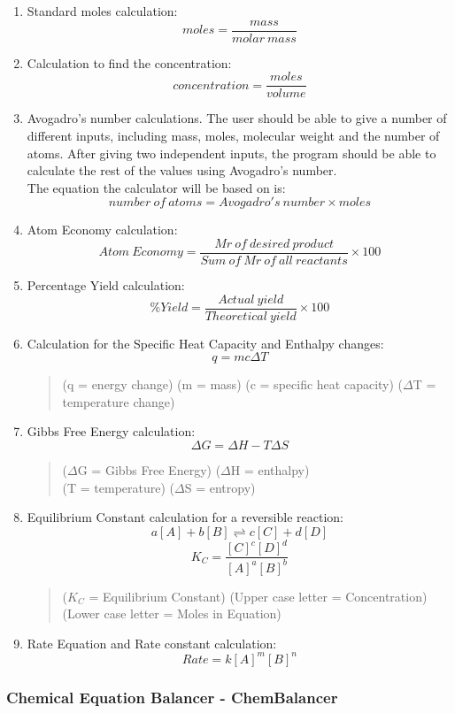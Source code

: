 \documentclass[a4paper,12pt]{article}
\begin{document}
\begin{enumerate}

\item Standard moles calculation:
\[moles=\frac{mass}{molar\: mass}\]
\item Calculation to find the concentration:
\[concentration=\frac{moles}{volume}\]
\newpage
\item Avogadro's number calculations. The user should be able to give a number of different inputs, including mass, moles, molecular weight and the number of atoms. After giving two independent inputs, the program should be able to calculate the rest of the values using Avogadro's number.\\
The equation the calculator will be based on is:
\[number\: of\: atoms = Avogadro's\: number \times moles\]
\item Atom Economy calculation:
\[Atom\: Economy = \frac{Mr\: of\: desired\: product}{Sum\: of\: Mr\: of\: all\: reactants}\times 100\]
\item Percentage Yield calculation:
\[\%Yield = \frac{Actual\: yield}{Theoretical\: yield} \times 100\]
\item Calculation for the Specific Heat Capacity and Enthalpy changes:
\[q = mc {\Delta} T\]
\begin{quote}
(q = energy change) (m = mass) (c = specific heat capacity) (${\Delta}$T = temperature change)
\end{quote}
\item Gibbs Free Energy calculation:
\[{\Delta}G = {\Delta}H - T{\Delta}S\]
\begin{quote}
(${\Delta}$G = Gibbs Free Energy) (${\Delta}$H = enthalpy)\\
(T = temperature) (${\Delta}$S = entropy)
\end{quote}
\item Equilibrium Constant calculation for a reversible reaction:
\[a[A] + b[B] \rightleftharpoons c[C] + d[D]\]
\[K_{C} = \frac{[C]^{c}[D]^{d}}{[A]^{a}[B]^{b}}\]
\begin{quote}
($K_{C}$ = Equilibrium Constant) (Upper case letter = Concentration) (Lower case letter = Moles in Equation)
\end{quote}
\item Rate Equation and Rate constant calculation:
\[Rate = k[A]^{m}[B]^{n}\]

\end{enumerate}

\newpage

\subsubsection{Chemical Equation Balancer - ChemBalancer}
\end{document}
